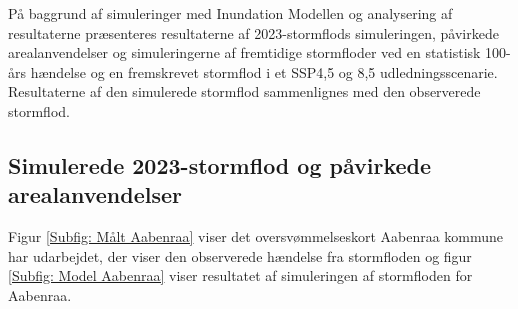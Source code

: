 
På baggrund af simuleringer med Inundation Modellen og analysering af resultaterne præsenteres resultaterne af 2023-stormflods simuleringen, påvirkede arealanvendelser og simuleringerne af fremtidige stormfloder ved en statistisk 100-års hændelse og en fremskrevet stormflod i et SSP4,5 og 8,5 udledningsscenarie. Resultaterne af den simulerede stormflod sammenlignes med den observerede stormflod.

\subsection{Simulerede 2023-stormflod og påvirkede arealanvendelser}
Figur \ref{Subfig: Målt Aabenraa} viser det oversvømmelseskort Aabenraa kommune har udarbejdet, der viser den observerede hændelse fra stormfloden og figur \ref{Subfig: Model Aabenraa} viser resultatet af simuleringen af stormfloden for Aabenraa. 
